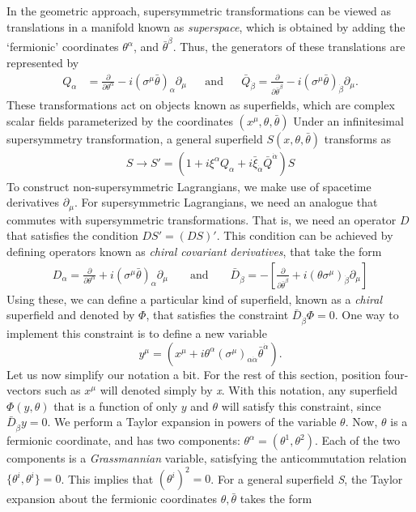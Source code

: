 In the geometric approach, supersymmetric transformations can be viewed as translations in a manifold known as \emph{superspace}, which is obtained by adding the `fermionic' coordinates $\theta^\alpha$, and $\bar{\theta}^{\dot{\beta}}$. Thus, the generators of these translations are represented by
\begin{align}
  Q_\alpha &= \frac{\partial}{\partial\theta^\alpha}-i(\sigma^\mu \bar{\theta})_\alpha \partial_\mu&&\text{and}&&
  \bar{Q}_{\dot{\beta}} = \frac{\partial}{\partial\bar{\theta}^{\dot{\beta}}}-i(\sigma^\mu\bar{\theta})_{\dot{\beta}}\partial_\mu.
\label{eq:susy_operators_diff_form}
\end{align}
These transformations act on objects known as superfields, which are complex scalar fields parameterized by the coordinates $(x^\mu,\theta,\bar{\theta})$
Under an infinitesimal supersymmetry transformation, a general superfield $S(x,\theta,\bar{\theta})$ transforms as
\begin{align}
S\rightarrow S' = (1+i\xi^\alpha Q_\alpha + i\bar{\xi}_{\dot{\alpha}}\bar{Q}^{\dot{\alpha}})S
\label{eq:gen_susy_transformation}
\end{align}
To construct non-supersymmetric Lagrangians, we make use of spacetime derivatives $\partial_\mu$. For supersymmetric Lagrangians, we need an analogue that commutes with supersymmetric transformations. That is, we need an operator $D$ that satisfies the condition $DS' = (DS)'$. This condition can be achieved by defining operators known as \emph{chiral covariant derivatives}, that take the form
\begin{align}
  D_\alpha = \frac{\partial}{\partial\theta^\alpha}+i(\sigma^\mu\bar{\theta})_\alpha\partial_\mu&&\text{ and }&&
  \bar{D}_{\dot{\beta}} = -\left[\frac{\partial}{\partial\bar{\theta}^{\dot{\beta}}}+i(\theta\sigma^\mu)_{\dot{\beta}}\partial_\mu\right]
\end{align}
Using these, we can define a particular kind of superfield, known as a \emph{chiral} superfield and denoted by $\Phi$, that satisfies the constraint $\bar{D}_{\dot{\beta}}\Phi = 0$. One way to implement this constraint is to define a new variable
\[y^\mu=(x^\mu+i\theta^\alpha(\sigma^\mu)_{\alpha\dot{\alpha}}\bar{\theta}^{\dot{\alpha}}).\]
Let us now simplify our notation a bit. For the rest of this section, position four-vectors such as $x^\mu$ will denoted simply by \emph{x}. With this notation, any superfield $\Phi(y,\theta)$ that is a function of only $y$ and $\theta$ will satisfy this constraint, since $\bar{D}_{\dot{\beta}}y = 0$. We perform a Taylor expansion in powers of the variable $\theta$. Now, $\theta$ is a fermionic coordinate, and has two components: $\theta^\alpha = (\theta^1,\theta^2)$. Each of the two components is a \emph{Grassmannian} variable, satisfying the anticommutation relation $\{\theta^i,\theta^i\} = 0$. This implies that $(\theta^i)^2 = 0$. For a general superfield \emph{S}, the Taylor expansion about the fermionic coordinates $\theta,\bar{\theta}$ takes the form

